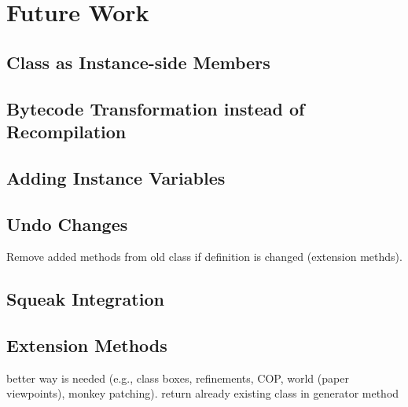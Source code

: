 \chapter{Future Work}
\label{sec:future}

\section{Class as Instance-side Members}
\label{sec:future_inst_side}

\section{Bytecode Transformation instead of Recompilation}

\section{Adding Instance Variables}

\section{Undo Changes}
Remove added methods from old class if definition is changed (extension methds).

\section{Squeak Integration}

\section{Extension Methods}
\label{sec:future_ext_meth}
better way is needed (e.g., class boxes, refinements, COP, world (paper viewpoints), monkey patching). return already existing class in generator method